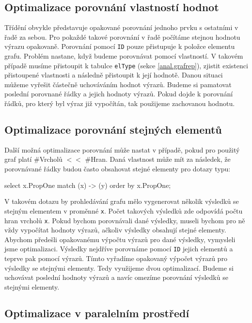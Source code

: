 \subsection{Optimalizace porovnání vlastností hodnot} \label{anal.orderby.opt1}

Třídění obvykle představuje opakované porovnání jednoho prvku s ostatními v řadě za sebou.
Pro pokaždé takové porovnání v řadě počítáme stejnou hodnotu výrazu opakovaně.
Porovnání pomocí \texttt{ID} pouze přistupuje k položce elementu grafu.
Problém nastane, když budeme porovnávat pomocí vlastností.
V takovém případě musíme přistoupit k tabulce \texttt{elType} (sekce \ref{anal.grafrep}), zjistit existenci přistoupené vlastnosti a následně přistoupit k její hodnotě.
Danou situaci můžeme vyřešit částečně uchováváním hodnot výrazů.
Budeme si pamatovat poslední porovnané řádky a jejich hodnoty výrazů.
Pokud dojde k porovnání řádků, pro který byl výraz již vypočítán, tak použijeme zachovanou hodnotu.

\subsection{Optimalizace porovnání stejných elementů} \label{anal.orderby.opt2}

Další možná optimalizace porovnání může nastat v případě, pokud pro použitý graf platí \#Vrcholů $<<$ \#Hran.
Daná vlastnost může mít za následek, že porovnávané řádky budou často obsahovat stejné elementy pro dotazy typu:
\begin{code}
select x.PropOne match (x) -> (y) order by x.PropOne;
\end{code}
V takovém dotazu by prohledávání grafu mělo vygenerovat několik výsledků se stejným elementem v proměnné \texttt{x}.
Počet takových výsledků zde odpovídá počtu hran vrcholů \texttt{x}.
Pokud bychom porovnávali dané výsledky, museli bychom pro ně vždy vypočítat hodnoty výrazů, ačkoliv výsledky obsahují stejné elementy.
Abychom předešli opakovanému výpočtu výrazů pro dané výsledky, vymysleli jsme optimalizaci.
Výsledky nejdříve porovnáme pomocí \texttt{ID} jejich elementů a teprve pak pomocí výrazů.
Tímto vyřadíme opakovaný výpočet výrazů pro výsledky se stejnými elementy.
Tedy využijeme dvou optimalizací.
Budeme si uchovávat poslední hodnoty výrazů a navíc omezíme porovnání výsledků se stejnými elementy.

\subsection{Optimalizace v paralelním prostředí}

